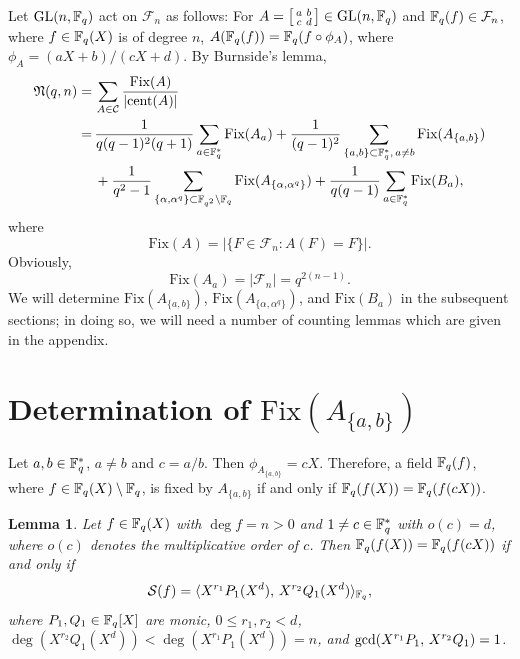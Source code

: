 \documentclass{amsart}
\newtheorem{lem}[thm]{Lemma}
\numberwithin{equation}{section}
\theoremstyle{definition}
\newcommand{\f}{\Bbb F}
\begin{document}
Let $\text{GL}(n,\f_q)$ act on $\mathcal F_n$ as follows: For $A=\left[\begin{smallmatrix}a&b\cr c&d\end{smallmatrix}\right]\in\text{GL}(n,\f_q)$ and $\f_q(f)\in\mathcal F_n$, where $f\in\f_q(X)$ is of degree $n$, $A(\f_q(f))=\f_q(f\circ\phi_A)$, where $\phi_A=(aX+b)/(cX+d)$.
By Burnside's lemma,
\begin{align}\label{B-lem}
\frak N(q,n)=\,&\sum_{A\in\mathcal C}\frac{\text{Fix}(A)}{|\text{cent}(A)|}\\
=\,&\frac 1{q(q-1)^2(q+1)}\sum_{a\in\f_q^*}\text{Fix}(A_a)+\frac 1{(q-1)^2}\sum_{\{a,b\}\subset\f_q^*,\,a\ne b}\text{Fix}(A_{\{a,b\}})\cr
&+\frac 1{q^2-1}\sum_{\{\alpha,\alpha^q\}\subset\f_{q^2}\setminus\f_q}\text{Fix}(A_{\{\alpha,\alpha^q\}})+\frac 1{q(q-1)}\sum_{a\in\f_q^*}\text{Fix}(B_a),\nonumber
\end{align}
where
\[
\text{Fix}(A)=|\{F\in\mathcal F_n:A(F)=F\}|.
\]
Obviously, 
\begin{equation}\label{fixAa}
\text{Fix}(A_a)=|\mathcal F_n|=q^{2(n-1)}.
\end{equation}
We will determine $\text{Fix}(A_{\{a,b\}})$, $\text{Fix}(A_{\{\alpha,\alpha^q\}})$, and $\text{Fix}(B_a)$ in the subsequent sections; in doing so, we will need a number of counting lemmas which are given in the appendix.



\section{Determination of $\text{Fix}(A_{\{a,b\}})$}

Let $a,b\in\f_q^*$, $a\ne b$ and $c=a/b$. Then $\phi_{A_{\{a,b\}}}=cX$. Therefore, a field $\f_q(f)$, where $f\in\f_q(X)\setminus\f_q$, is fixed by $A_{\{a,b\}}$ if and only if $\f_q(f(X))=\f_q(f(cX))$.

\begin{lem}\label{L2.0} Let $f\in\f_q(X)$ with $\deg f=n>0$ and $1\ne c\in\f_q^*$ with $o(c)=d$, where $o(c)$ denotes the multiplicative order of $c$. Then $\f_q(f(X))=\f_q(f(cX))$ if and only if
\[
\mathcal S(f)=\langle X^{r_1}P_1(X^d),\,X^{r_2}Q_1(X^d)\rangle_{\f_q},
\]
where $P_1,Q_1\in\f_q[X]$ are monic, $0\le r_1,r_2<d$, $\deg(X^{r_2}Q_1(X^d))<\deg(X^{r_1}P_1(X^d))=n$, and $\text{\rm gcd}(X^{r_1}P_1,\,X^{r_2}Q_1)=1$.
\end{lem}
\end{document}
